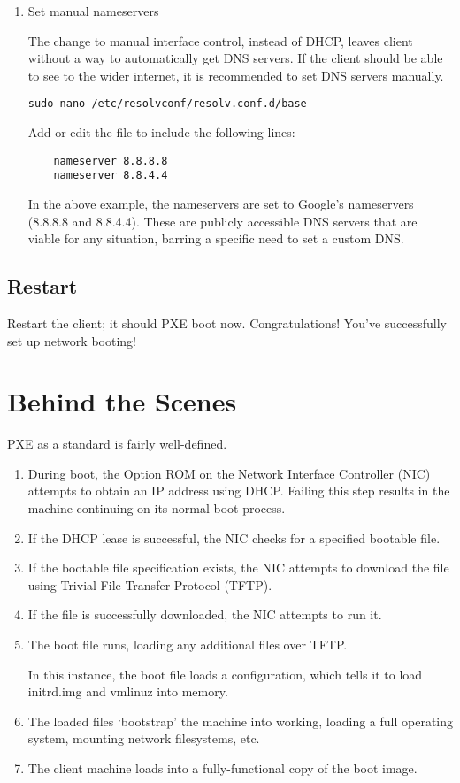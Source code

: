\documentclass{article}
\begin{document}
\begin{flushleft}
\begin{enumerate}
  \item Set manual nameservers

  The change to manual interface control, instead of DHCP, leaves client without a way to automatically get DNS servers.  If the client should be able to see to the wider internet, it is recommended to set DNS servers manually.

  \verb|sudo nano /etc/resolvconf/resolv.conf.d/base|

  Add or edit the file to include the following lines:

  \begin{verbatim}
    nameserver 8.8.8.8
    nameserver 8.8.4.4
  \end{verbatim}

  In the above example, the nameservers are set to Google's nameservers (8.8.8.8 and 8.8.4.4).  These are publicly accessible DNS servers that are viable for any situation, barring a specific need to set a custom DNS.

\end{enumerate}
\subsection{Restart}
Restart the client; it should PXE boot now.  Congratulations!  You've successfully set up network booting!
\pagebreak
\section{Behind the Scenes}
PXE as a standard is fairly well-defined.

\begin{enumerate}
  \item During boot, the Option ROM on the Network Interface Controller (NIC) attempts to obtain an IP address using DHCP.  Failing this step results in the machine continuing on its normal boot process.
  \item If the DHCP lease is successful, the NIC checks for a specified bootable file.
  \item If the bootable file specification exists, the NIC attempts to download the file using Trivial File Transfer Protocol (TFTP).
  \item If the file is successfully downloaded, the NIC attempts to run it.
  \item The boot file runs, loading any additional files over TFTP.

  In this instance, the boot file loads a configuration, which tells it to load initrd.img and vmlinuz into memory.
  \item The loaded files `bootstrap' the machine into working, loading a full operating system, mounting network filesystems, etc.
  \item The client machine loads into a fully-functional copy of the boot image.
\end{enumerate}
\end{flushleft}
\end{document}
